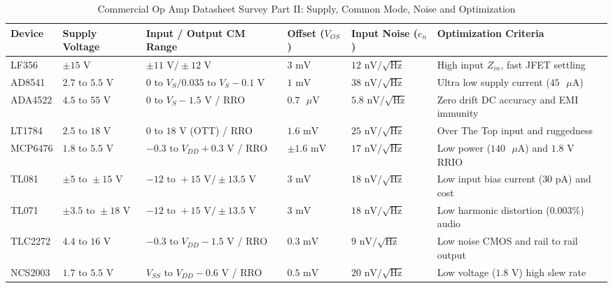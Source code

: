 \documentclass[conference]{IEEEtran}
\begin{document}
\begin{table}[!t]
\centering
\caption{Commercial Op Amp Datasheet Survey Part II: Supply, Common Mode, Noise and Optimization}
\label{tab:datasheets_part2}
\small
\begin{tabularx}{\textwidth}{@{}l >{\centering\arraybackslash}p{1.7cm} >{\centering\arraybackslash}p{2.3cm} >{\centering\arraybackslash}p{1.5cm} >{\centering\arraybackslash}p{1.7cm} X@{}}
\toprule
\textbf{Device} & \textbf{Supply Voltage} & \textbf{Input / Output CM Range} & \textbf{Offset ($V_{OS}$)} & \textbf{Input Noise ($e_n$)} & \textbf{Optimization Criteria} \\
\midrule
LF356 & $\pm 15\text{ V}$ & $\pm 11\text{ V} / \pm 12\text{ V}$ & $3\text{ mV}$ & $12\text{ nV}/\sqrt{\text{Hz}}$ & High input $Z_{in}$, fast JFET settling \\
AD8541 & $2.7\text{ to }5.5\text{ V}$ & $0\text{ to }V_S / 0.035\text{ to }V_S - 0.1\text{ V}$ & $1\text{ mV}$ & $38\text{ nV}/\sqrt{\text{Hz}}$ & Ultra low supply current ($45\text{ }\mu\text{A}$) \\
ADA4522 & $4.5\text{ to }55\text{ V}$ & $0\text{ to }V_S - 1.5\text{ V}$ / RRO & $0.7\text{ }\mu\text{V}$ & $5.8\text{ nV}/\sqrt{\text{Hz}}$ & Zero drift DC accuracy and EMI immunity \\
LT1784 & $2.5\text{ to }18\text{ V}$ & $0\text{ to }18\text{ V}$ (OTT) / RRO & $1.6\text{ mV}$ & $25\text{ nV}/\sqrt{\text{Hz}}$ & Over The Top input and ruggedness \\
MCP6476 & $1.8\text{ to }5.5\text{ V}$ & $-0.3\text{ to }V_{DD} + 0.3\text{ V}$ / RRO & $\pm 1.6\text{ mV}$ & $17\text{ nV}/\sqrt{\text{Hz}}$ & Low power ($140\text{ }\mu\text{A}$) and $1.8\text{ V}$ RRIO \\
TL081 & $\pm 5\text{ to }\pm 15\text{ V}$ & $-12\text{ to }+15\text{ V} / \pm 13.5\text{ V}$ & $3\text{ mV}$ & $18\text{ nV}/\sqrt{\text{Hz}}$ & Low input bias current ($30\text{ pA}$) and cost \\
TL071 & $\pm 3.5\text{ to }\pm 18\text{ V}$ & $-12\text{ to }+15\text{ V} / \pm 13.5\text{ V}$ & $3\text{ mV}$ & $18\text{ nV}/\sqrt{\text{Hz}}$ & Low harmonic distortion ($0.003\%$) audio \\
TLC2272 & $4.4\text{ to }16\text{ V}$ & $-0.3\text{ to }V_{DD} - 1.5\text{ V}$ / RRO & $0.3\text{ mV}$ & $9\text{ nV}/\sqrt{\text{Hz}}$ & Low noise CMOS and rail to rail output \\
NCS2003 & $1.7\text{ to }5.5\text{ V}$ & $V_{SS}\text{ to }V_{DD} - 0.6\text{ V}$ / RRO & $0.5\text{ mV}$ & $20\text{ nV}/\sqrt{\text{Hz}}$ & Low voltage ($1.8\text{ V}$) high slew rate \\
\bottomrule
\end{tabularx}
\end{table}
\end{document}

